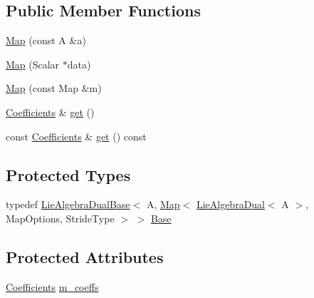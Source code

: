 \subsection*{Public Member Functions}
\begin{DoxyCompactItemize}
\item 
\hyperlink{class_map_3_01_lie_algebra_dual_3_01_a_01_4_00_01_map_options_00_01_stride_type_01_4_a343da7ed6d4069324cd174c8fa51a43f}{Map} (const A \&a)
\item 
\hyperlink{class_map_3_01_lie_algebra_dual_3_01_a_01_4_00_01_map_options_00_01_stride_type_01_4_abb5e0ae70ea55163f6890a8ccf4be175}{Map} (Scalar $\ast$data)
\item 
\hyperlink{class_map_3_01_lie_algebra_dual_3_01_a_01_4_00_01_map_options_00_01_stride_type_01_4_aebaf7d71c6542435ab56dc9ef7238dce}{Map} (const Map \&m)
\item 
\hyperlink{class_map_3_01_lie_algebra_dual_3_01_a_01_4_00_01_map_options_00_01_stride_type_01_4_ab39602ca662c12f4aa9031d05157fb73}{Coefficients} \& \hyperlink{class_map_3_01_lie_algebra_dual_3_01_a_01_4_00_01_map_options_00_01_stride_type_01_4_a1f2fac20422f722801d08119858da932}{get} ()
\item 
const \hyperlink{class_map_3_01_lie_algebra_dual_3_01_a_01_4_00_01_map_options_00_01_stride_type_01_4_ab39602ca662c12f4aa9031d05157fb73}{Coefficients} \& \hyperlink{class_map_3_01_lie_algebra_dual_3_01_a_01_4_00_01_map_options_00_01_stride_type_01_4_ad394c3da74046cb6660b62e9b7651b2a}{get} () const
\end{DoxyCompactItemize}
\subsection*{Protected Types}
\begin{DoxyCompactItemize}
\item 
typedef \hyperlink{class_lie_algebra_dual_base}{Lie\+Algebra\+Dual\+Base}$<$ A, \hyperlink{class_map_3_01_lie_algebra_dual_3_01_a_01_4_00_01_map_options_00_01_stride_type_01_4_a343da7ed6d4069324cd174c8fa51a43f}{Map}$<$ \hyperlink{class_lie_algebra_dual}{Lie\+Algebra\+Dual}$<$ A $>$, Map\+Options, Stride\+Type $>$ $>$ \hyperlink{class_map_3_01_lie_algebra_dual_3_01_a_01_4_00_01_map_options_00_01_stride_type_01_4_ad1209b4cd7e7831c3556bae3a466822b}{Base}
\end{DoxyCompactItemize}
\subsection*{Protected Attributes}
\begin{DoxyCompactItemize}
\item 
\hyperlink{class_map_3_01_lie_algebra_dual_3_01_a_01_4_00_01_map_options_00_01_stride_type_01_4_ab39602ca662c12f4aa9031d05157fb73}{Coefficients} \hyperlink{class_map_3_01_lie_algebra_dual_3_01_a_01_4_00_01_map_options_00_01_stride_type_01_4_ac9091870e5a828077c30647d4d296c55}{m\+\_\+coeffs}
\end{DoxyCompactItemize}



